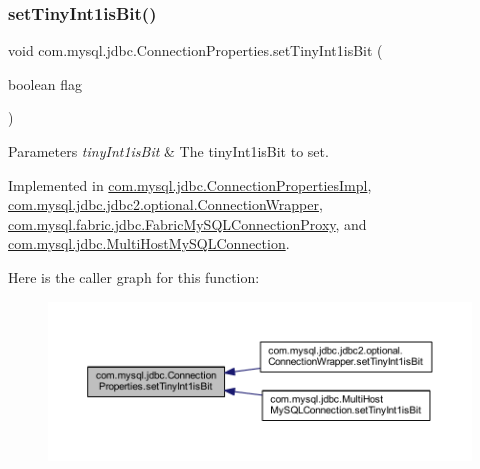\subsubsection{\texorpdfstring{set\+Tiny\+Int1is\+Bit()}{setTinyInt1isBit()}}
{\footnotesize\ttfamily void com.\+mysql.\+jdbc.\+Connection\+Properties.\+set\+Tiny\+Int1is\+Bit (\begin{DoxyParamCaption}\item[{boolean}]{flag }\end{DoxyParamCaption})}


\begin{DoxyParams}{Parameters}
{\em tiny\+Int1is\+Bit} & The tiny\+Int1is\+Bit to set. \\
\hline
\end{DoxyParams}


Implemented in \mbox{\hyperlink{classcom_1_1mysql_1_1jdbc_1_1_connection_properties_impl_a6605c6ba04a1e83fb9f0ae6cb527a1fb}{com.\+mysql.\+jdbc.\+Connection\+Properties\+Impl}}, \mbox{\hyperlink{classcom_1_1mysql_1_1jdbc_1_1jdbc2_1_1optional_1_1_connection_wrapper_a6cad9c36cb924008caf164e37c618362}{com.\+mysql.\+jdbc.\+jdbc2.\+optional.\+Connection\+Wrapper}}, \mbox{\hyperlink{classcom_1_1mysql_1_1fabric_1_1jdbc_1_1_fabric_my_s_q_l_connection_proxy_abeefce502d9cd8b8a7c6cdbd92fb1274}{com.\+mysql.\+fabric.\+jdbc.\+Fabric\+My\+S\+Q\+L\+Connection\+Proxy}}, and \mbox{\hyperlink{classcom_1_1mysql_1_1jdbc_1_1_multi_host_my_s_q_l_connection_a7f6ba35d4da5c8ab2972086f48f02227}{com.\+mysql.\+jdbc.\+Multi\+Host\+My\+S\+Q\+L\+Connection}}.

Here is the caller graph for this function\+:\nopagebreak
\begin{figure}[H]
\begin{center}
\leavevmode
\includegraphics[width=350pt]{interfacecom_1_1mysql_1_1jdbc_1_1_connection_properties_ac1fb7af1cc73512dd8dac99bdc7a5602_icgraph}
\end{center}
\end{figure}
\mbox{\label{interfacecom_1_1mysql_1_1jdbc_1_1_connection_properties_a304661cd6d7b203e033ad219de96e0d7}} 
